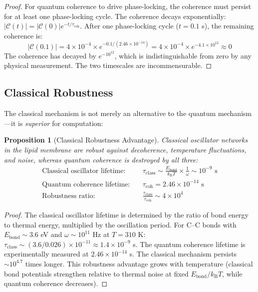 \documentclass[12pt]{article}
\newtheorem{proposition}[theorem]{Proposition}
\theoremstyle{definition}
\theoremstyle{remark}
\newcommand{\kB}{k_{\mathrm{B}}}
\begin{document}
\begin{proof}
For quantum coherence to drive phase-locking, the coherence must persist for at least one phase-locking cycle. The coherence decays exponentially: $|\mathcal{C}(t)| = |\mathcal{C}(0)| e^{-t/\tau_{\mathrm{coh}}}$. After one phase-locking cycle ($t = 0.1$ s), the remaining coherence is:
\begin{equation}
|\mathcal{C}(0.1)| = 4 \times 10^{-4} \times e^{-0.1/(2.46 \times 10^{-14})} = 4 \times 10^{-4} \times e^{-4.1 \times 10^{12}} \approx 0
\end{equation}
The coherence has decayed by $e^{-10^{12}}$, which is indistinguishable from zero by any physical measurement. The two timescales are incommensurable. \qedhere
\end{proof}

\subsection{Classical Robustness}

The classical mechanism is not merely an alternative to the quantum mechanism---it is \emph{superior} for computation:

\begin{proposition}[Classical Robustness Advantage]
\label{prop:robustness}
Classical oscillator networks in the lipid membrane are robust against decoherence, temperature fluctuations, and noise, whereas quantum coherence is destroyed by all three:
\begin{align}
\text{Classical oscillator lifetime:} &\quad \tau_{\mathrm{class}} \sim \frac{E_{\mathrm{bond}}}{\kB T} \times \frac{1}{\omega} \sim 10^{-9} \text{ s} \label{eq:classical_lifetime} \\
\text{Quantum coherence lifetime:} &\quad \tau_{\mathrm{coh}} = 2.46 \times 10^{-14} \text{ s} \label{eq:quantum_lifetime} \\
\text{Robustness ratio:} &\quad \frac{\tau_{\mathrm{class}}}{\tau_{\mathrm{coh}}} \sim 4 \times 10^4 \label{eq:robustness_ratio}
\end{align}
\end{proposition}

\begin{proof}
The classical oscillator lifetime is determined by the ratio of bond energy to thermal energy, multiplied by the oscillation period. For C--C bonds with $E_{\mathrm{bond}} \sim 3.6$ eV and $\omega \sim 10^{11}$ Hz at $T = 310$ K: $\tau_{\mathrm{class}} \sim (3.6/0.026) \times 10^{-11} \approx 1.4 \times 10^{-9}$ s. The quantum coherence lifetime is experimentally measured at $2.46 \times 10^{-14}$ s. The classical mechanism persists $\sim 10^{4.7}$ times longer. This robustness advantage grows with temperature (classical bond potentials strengthen relative to thermal noise at fixed $E_{\mathrm{bond}}/\kB T$, while quantum coherence decreases). \qedhere
\end{proof}
\end{document}
